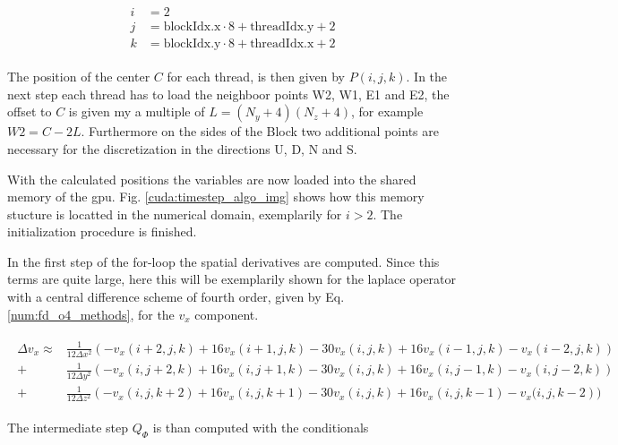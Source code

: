 \begin{align}
    \begin{split}
    i &= 2\\
    j &= \text{blockIdx.x}\cdot 8 + \text{threadIdx.y} + 2\\
    k &= \text{blockIdx.y}\cdot 8 + \text{threadIdx.x} + 2
    \end{split}
\end{align}

The position of the center $C$ for each thread, is then given by $P(i, j, k)$.
In the next step each thread has to load the neighboor points W2, W1, E1 and E2,
the offset to $C$ is given my a multiple of $L=(N_y+4)(N_z+4)$, for example $W2= C - 2L$.
Furthermore on the sides of the Block two additional points are necessary for the discretization
in the directions U, D, N and S.

With the calculated positions the variables are now loaded into the shared memory of the gpu.
Fig. \ref{cuda:timestep_algo_img} shows how this memory stucture is locatted in the numerical domain, exemplarily for $i>2$.
The initialization procedure is finished.

In the first step of the for-loop the spatial derivatives are computed.
Since this terms are quite large, here this will be exemplarily shown for the laplace operator
with a central difference scheme of fourth order, given by Eq. \ref{num:fd_o4_methods}, for the $v_x$ component.

\begin{align}
    \begin{split}
    \Delta v_x   \approx &  \frac{1}{12\Delta x^2} \left(-v_x(i+2, j, k) + 16v_x(i+1, j, k) - 30v_x(i, j, k) + 16v_x(i-1, j, k)-v_x(i-2, j, k)\right)\\
                              +&  \frac{1}{12\Delta y^2} \left(-v_x(i, j+2, k) + 16v_x(i, j+1, k) - 30v_x(i, j, k) + 16v_x(i, j-1, k)-v_x(i, j-2, k)\right)\\
                              +&  \frac{1}{12\Delta z^2} \left(-v_x(i, j, k+2) + 16v_x(i, j, k+1) - 30v_x(i, j, k) + 16v_x(i, j, k-1)-v_x(i, j, k-2\right))
    \end{split}
\end{align}

The intermediate step $Q_{\Phi}$ is than computed with the conditionals


